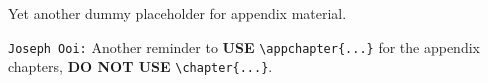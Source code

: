 
Yet another dummy placeholder for appendix material.

\texttt{Joseph Ooi:} Another reminder to \textbf{USE} \verb|\appchapter{...}| for the appendix chapters, \textbf{DO NOT USE} \verb|\chapter{...}|. 
